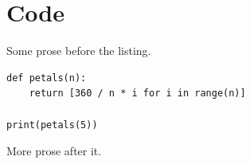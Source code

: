 \documentclass{article}
\begin{document}
\section{Code}
Some prose before the listing.

\begin{verbatim}
def petals(n):
    return [360 / n * i for i in range(n)]

print(petals(5))
\end{verbatim}

More prose after it.
\end{document}
